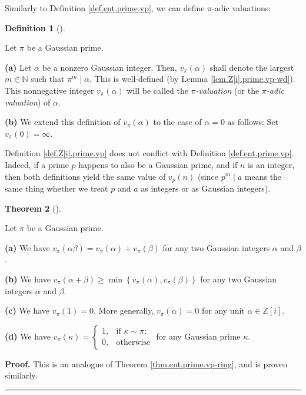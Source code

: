 \documentclass[numbers=enddot,12pt,final,onecolumn,notitlepage]{scrartcl}%
\numberwithin{exer}{subsection}
\theoremstyle{definition}
\newtheorem{theo}{Theorem}[subsection]
\newenvironment{theorem}[1][]
{\begin{theo}[#1]\begin{leftbar}}
{\end{leftbar}\end{theo}}
\newtheorem{defi}[theo]{Definition}
\newenvironment{definition}[1][]
{\begin{defi}[#1]\begin{leftbar}}
{\end{leftbar}\end{defi}}
\newenvironment{proof}[1][Proof]{\noindent\textbf{#1.} }{\ \rule{0.5em}{0.5em}}
\begin{document}
Similarly to Definition \ref{def.ent.prime.vp}, we can define $\pi$-adic valuations:

\begin{definition}
\label{def.Z[i].prime.vp}Let $\pi$ be a Gaussian prime.

\textbf{(a)} Let $\alpha$ be a nonzero Gaussian integer. Then, $v_{\pi}\left(
\alpha\right)  $ shall denote the largest $m\in\mathbb{N}$ such that $\pi
^{m}\mid\alpha$. This is well-defined (by Lemma \ref{lem.Z[i].prime.vp-wd}).
This nonnegative integer $v_{\pi}\left(  \alpha\right)  $ will be called the
$\pi$\textit{-valuation} (or the $\pi$\textit{-adic valuation}) of $\alpha$.

\textbf{(b)} We extend this definition of $v_{\pi}\left(  \alpha\right)  $ to
the case of $\alpha=0$ as follows: Set $v_{\pi}\left(  0\right)  =\infty$.
\end{definition}

Definition \ref{def.Z[i].prime.vp} does not conflict with Definition
\ref{def.ent.prime.vp}. Indeed, if a prime $p$ happens to also be a Gaussian
prime, and if $n$ is an integer, then both definitions yield the same value of
$v_{p}\left(  n\right)  $ (since $p^{m}\mid a$ means the same thing whether we
treat $p$ and $a$ as integers or as Gaussian integers).

\begin{theorem}
\label{thm.Z[i].prime.vp-ring}Let $\pi$ be a Gaussian prime.

\textbf{(a)} We have $v_{\pi}\left(  \alpha\beta\right)  =v_{\pi}\left(
\alpha\right)  +v_{\pi}\left(  \beta\right)  $ for any two Gaussian integers
$\alpha$ and $\beta$.

\textbf{(b)} We have $v_{\pi}\left(  \alpha+\beta\right)  \geq\min\left\{
v_{\pi}\left(  \alpha\right)  ,v_{\pi}\left(  \beta\right)  \right\}  $ for
any two Gaussian integers $\alpha$ and $\beta$.

\textbf{(c)} We have $v_{\pi}\left(  1\right)  =0$. More generally, $v_{\pi
}\left(  \alpha\right)  =0$ for any unit $\alpha\in\mathbb{Z}\left[  i\right]
$.

\textbf{(d)} We have $v_{\pi}\left(  \kappa\right)  =%
\begin{cases}
1, & \text{if }\kappa\sim\pi;\\
0, & \text{otherwise}%
\end{cases}
$ for any Gaussian prime $\kappa$.
\end{theorem}

\begin{proof}
This is an analogue of Theorem \ref{thm.ent.prime.vp-ring}, and is proven similarly.
\end{proof}
\end{document}
